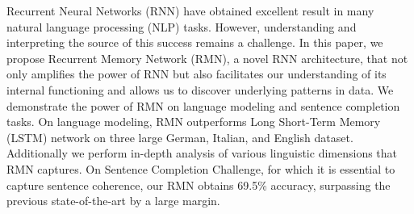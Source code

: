 Recurrent Neural Networks (RNN) have obtained excellent result in many natural language processing (NLP) tasks. However, understanding and interpreting the source of this success remains a challenge. In this paper, we propose Recurrent Memory Network (RMN), a novel RNN architecture, that not only amplifies the power of RNN  but also facilitates our understanding of its internal functioning and allows us to discover underlying patterns in data. We demonstrate the power of RMN on language modeling and sentence completion tasks. On language modeling, RMN outperforms Long Short-Term Memory (LSTM) network on three large German, Italian, and English dataset. Additionally we perform in-depth analysis of various linguistic dimensions that RMN captures. On Sentence Completion Challenge, for which it is essential to capture sentence coherence, our RMN obtains 69.5\% accuracy, surpassing the previous state-of-the-art by a large margin.
